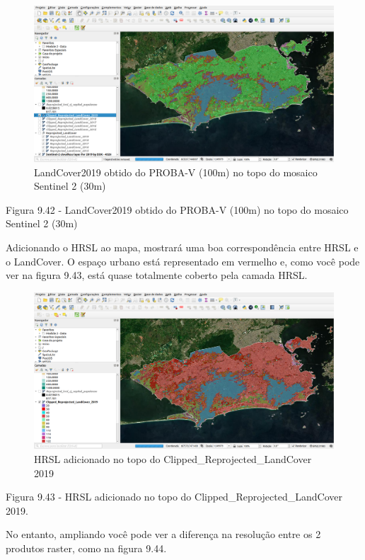 \documentclass[
]{krantz}
\begin{document}
\begin{figure}
\centering
\includegraphics{media/modulo9/fig942.png}
\caption{LandCover2019 obtido do PROBA-V (100m) no topo do mosaico Sentinel 2 (30m)}
\end{figure}

Figura 9.42 - LandCover2019 obtido do PROBA-V (100m) no topo do mosaico Sentinel 2 (30m)

Adicionando o HRSL ao mapa, mostrará uma boa correspondência entre HRSL e o LandCover. O espaço urbano está representado em vermelho e, como você pode ver na figura 9.43, está quase totalmente coberto pela camada HRSL.

\begin{figure}
\centering
\includegraphics{media/modulo9/fig943.png}
\caption{HRSL adicionado no topo do Clipped\_Reprojected\_LandCover 2019}
\end{figure}

Figura 9.43 - HRSL adicionado no topo do Clipped\_Reprojected\_LandCover 2019.

No entanto, ampliando você pode ver a diferença na resolução entre os 2 produtos raster, como na figura 9.44.
\end{document}
